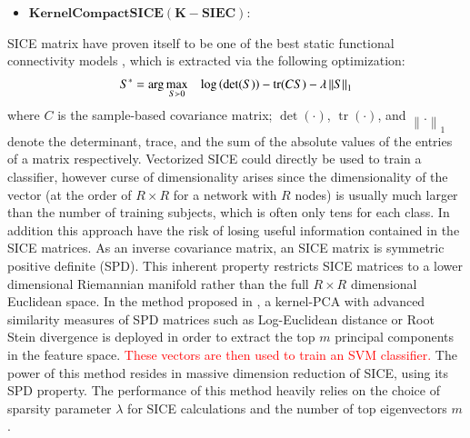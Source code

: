 \documentclass[preprint,12pt]{elsarticle}
\newcommand\norm[1]{\left\lVert#1\right\rVert}
\begin{document}
\begin{itemize}
	\item $\mathbf{Kernel Compact SICE(K-SIEC):}$ 
\end{itemize}
SICE matrix have proven itself to be one of the best static functional connectivity models \cite{r15,r60,r61,r62, r63}, which is extracted via the following optimization:
\begin{align}
S^* = \operatorname{arg} \max\limits_{S\succ 0} \hspace{3mm} \log \left( \det(S) \right) - \operatorname{tr}(CS) - \lambda \norm{S}_1
\end{align}
where $C$ is the sample-based covariance matrix; $\det(·)$, $\operatorname{tr}(·)$,
and $\norm{.}_1$ denote the determinant, trace, and the sum of the absolute values of the entries of a matrix respectively. Vectorized SICE could directly be used to train a classifier\cite{r19}, however curse of dimensionality arises since the dimensionality of the vector (at the order of $R \times R$ for a network
with $R$ nodes) is usually much
larger than the number of training subjects, which is often only tens for each class. In addition this approach have the risk of losing useful information contained in the SICE matrices. As an inverse covariance matrix, an SICE matrix is symmetric positive definite (SPD). This inherent property restricts SICE matrices to a lower dimensional Riemannian manifold rather than the full $R \times R$ dimensional Euclidean space. In the method proposed in \cite{r14}, a kernel-PCA with advanced similarity measures of SPD matrices such as Log-Euclidean distance\cite{r49} or Root Stein divergence\cite{r50} is deployed in order to extract the top $m$ principal components in the feature space. \textcolor{red}{These vectors are then used to train an SVM classifier.} The power of this method resides in massive dimension reduction of SICE, using its SPD property. The performance of this method heavily relies on the choice of sparsity parameter $\lambda$ for SICE calculations and the number of top eigenvectors $m$. 



 
\end{document}
